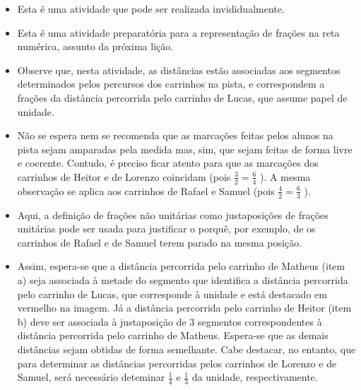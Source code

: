 \begin{multicols}{2}
  \begin{itemize} %
    \item       Esta é uma atividade que pode ser realizada invididualmente.
    \item       Esta é uma atividade preparatória para a representação de frações na reta numérica, assunto da próxima lição.
    \item       Observe que, nesta atividade, as distâncias estão associadas aos segmentos determinados pelos percursos dos carrinhos na pista, e correspondem a frações da distância percorrida pelo carrinho de Lucas, que assume papel de unidade.
    \item       Não se espera nem se recomenda que as marcações feitas pelos alunos na pista sejam amparadas pela medida mas, sim, que sejam feitas de forma livre e coerente. Contudo, é preciso ficar atento para que as marcações dos carrinhos de Heitor e de Lorenzo coincidam (pois       $\frac{3}{2} = \frac{6}{4}$      ). A mesma observação se aplica aos carrinhos de Rafael e Samuel (pois       $\frac{4}{2} = \frac{6}{3}$      ).
    \item       Aqui, a definição de frações não unitárias como justaposições de frações unitárias pode ser usada para justificar o porquê, por exemplo, de os carrinhos de Rafael e de Samuel terem parado na mesma posição.
    \item       Assim, espera-se que a distância percorrida pelo carrinho de Matheus (item a) seja associada à metade do segmento que identifica a distância percorrida pelo carrinho de Lucas, que corresponde à unidade e está destacado em vermelho na imagem. Já a distância percorrida pelo carrinho de Heitor (item b) deve ser associada à justaposição de       $3$       segmentos correspondentes à distância percorrida pelo carrinho de Matheus. Espera-se que as demais distâncias sejam obtidas de forma semelhante. Cabe destacar, no entanto, que para determinar as distâncias percorridas pelos carrinhos de Lorenzo e de Samuel, será necessário deteminar       $\frac{1}{4}$       e       $\frac{1}{3}$       da unidade, respectivamente.

\end{itemize}
\end{multicols}
